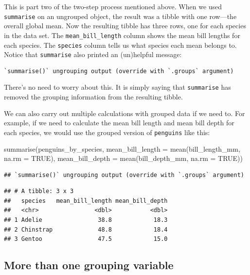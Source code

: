 \documentclass[
]{book}
\newenvironment{Shaded}{\begin{snugshade}}{\end{snugshade}}
\newcommand{\AttributeTok}[1]{\textcolor[rgb]{0.77,0.63,0.00}{#1}}
\newcommand{\ConstantTok}[1]{\textcolor[rgb]{0.00,0.00,0.00}{#1}}
\newcommand{\FunctionTok}[1]{\textcolor[rgb]{0.00,0.00,0.00}{#1}}
\newcommand{\NormalTok}[1]{#1}
\begin{document}
This is part two of the two-step process mentioned above. When we used \texttt{summarise} on an ungrouped object, the result was a tibble with one row---the overall global mean. Now the resulting tibble has three rows, one for each species in the data set. The \texttt{mean\_bill\_length} column shows the mean bill lengths for each species. The \texttt{species} column tells us what species each mean belongs to. Notice that \texttt{summarise} also printed an (un)helpful message:

\begin{verbatim}
`summarise()` ungrouping output (override with `.groups` argument)
\end{verbatim}

There's no need to worry about this. It is simply saying that \texttt{summarise} has removed the grouping information from the resulting tibble.

We can also carry out multiple calculations with grouped data if we need to. For example, if we need to calculate the mean bill length and mean bill depth for each species, we would use the grouped version of \texttt{penguins} like this:

\begin{Shaded}
\begin{Highlighting}[]
\FunctionTok{summarise}\NormalTok{(penguins\_by\_species, }
          \AttributeTok{mean\_bill\_length =} \FunctionTok{mean}\NormalTok{(bill\_length\_mm, }\AttributeTok{na.rm =} \ConstantTok{TRUE}\NormalTok{),}
          \AttributeTok{mean\_bill\_depth  =} \FunctionTok{mean}\NormalTok{(bill\_depth\_mm,  }\AttributeTok{na.rm =} \ConstantTok{TRUE}\NormalTok{))}
\end{Highlighting}
\end{Shaded}

\begin{verbatim}
## `summarise()` ungrouping output (override with `.groups` argument)
\end{verbatim}

\begin{verbatim}
## # A tibble: 3 x 3
##   species   mean_bill_length mean_bill_depth
##   <chr>                <dbl>           <dbl>
## 1 Adelie                38.8            18.3
## 2 Chinstrap             48.8            18.4
## 3 Gentoo                47.5            15.0
\end{verbatim}

\hypertarget{more-than-one-grouping-variable}{%
\subsection{More than one grouping variable}\label{more-than-one-grouping-variable}}
\end{document}
